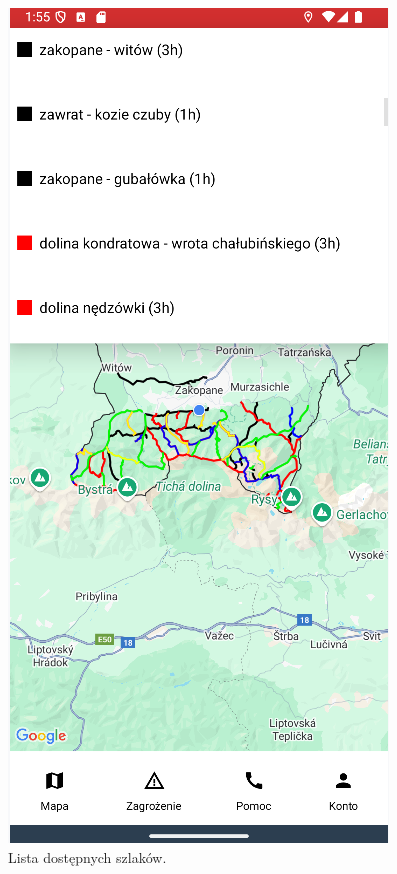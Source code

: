 \begin{figure}[H]
    \centering
    \includegraphics[scale=0.6]{img/imp/lista_szlakow.png}
    \caption{Lista dostępnych szlaków.}
    \label{widok:wyborszlaku}
\end{figure}

